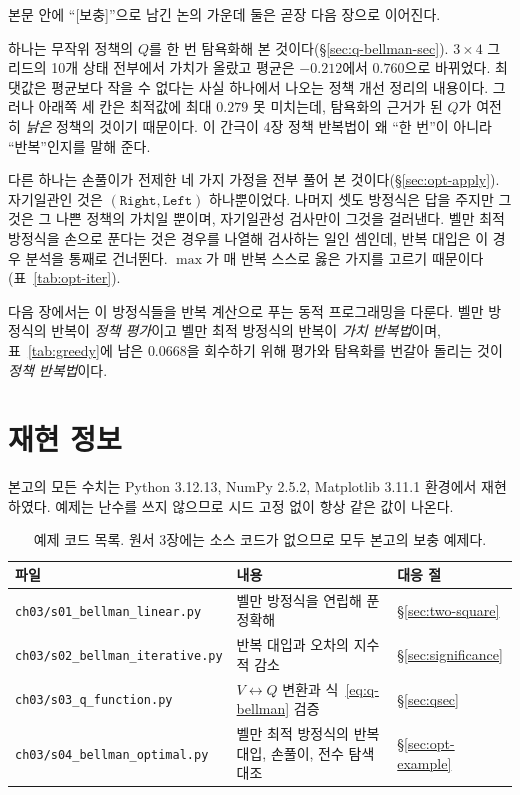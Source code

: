 \documentclass[11pt,a4paper]{article}
\begin{document}
본문 안에 ``[보충]''으로 남긴 논의 가운데 둘은 곧장 다음 장으로 이어진다.

하나는 무작위 정책의 $Q$를 한 번 탐욕화해 본 것이다(\S\ref{sec:q-bellman-sec}). $3\times4$ 그리드의 10개
상태 전부에서 가치가 올랐고 평균은 $-0.212$에서 $0.760$으로 바뀌었다. 최댓값은 평균보다 작을 수 없다는
사실 하나에서 나오는 정책 개선 정리의 내용이다. 그러나 아래쪽 세 칸은 최적값에 최대 $0.279$ 못 미치는데,
탐욕화의 근거가 된 $Q$가 여전히 \emph{낡은} 정책의 것이기 때문이다. 이 간극이 4장 정책 반복법이 왜
``한 번''이 아니라 ``반복''인지를 말해 준다.

다른 하나는 손풀이가 전제한 네 가지 가정을 전부 풀어 본 것이다(\S\ref{sec:opt-apply}). 자기일관인 것은
$(\texttt{Right},\texttt{Left})$ 하나뿐이었다. 나머지 셋도 방정식은 답을 주지만 그것은 그 나쁜 정책의
가치일 뿐이며, 자기일관성 검사만이 그것을 걸러낸다. 벨만 최적 방정식을 손으로 푼다는 것은 경우를
나열해 검사하는 일인 셈인데, 반복 대입은 이 경우 분석을 통째로 건너뛴다. $\max$가 매 반복 스스로 옳은
가지를 고르기 때문이다(표~\ref{tab:opt-iter}).

다음 장에서는 이 방정식들을 반복 계산으로 푸는 동적 프로그래밍을 다룬다. 벨만 방정식의 반복이
\emph{정책 평가}이고 벨만 최적 방정식의 반복이 \emph{가치 반복법}이며, 표~\ref{tab:greedy}에 남은
$0.0668$을 회수하기 위해 평가와 탐욕화를 번갈아 돌리는 것이 \emph{정책 반복법}이다.

\section*{재현 정보}

본고의 모든 수치는 Python 3.12.13, NumPy 2.5.2, Matplotlib 3.11.1 환경에서 재현하였다. 예제는 난수를
쓰지 않으므로 시드 고정 없이 항상 같은 값이 나온다.

\begin{table}[htbp]
\centering
\caption{예제 코드 목록. 원서 3장에는 소스 코드가 없으므로 모두 본고의 보충 예제다.}
\label{tab:code}
\small
\begin{tabular}{@{}lll@{}}
\toprule
파일 & 내용 & 대응 절 \\
\midrule
\texttt{ch03/s01\_bellman\_linear.py}    & 벨만 방정식을 연립해 푼 정확해                    & \S\ref{sec:two-square} \\
\texttt{ch03/s02\_bellman\_iterative.py} & 반복 대입과 오차의 지수적 감소                    & \S\ref{sec:significance} \\
\texttt{ch03/s03\_q\_function.py}        & $V\leftrightarrow Q$ 변환과 식~\eqref{eq:q-bellman} 검증 & \S\ref{sec:qsec} \\
\texttt{ch03/s04\_bellman\_optimal.py}   & 벨만 최적 방정식의 반복 대입, 손풀이, 전수 탐색 대조 & \S\ref{sec:opt-example} \\
\bottomrule
\end{tabular}
\end{table}
\end{document}
